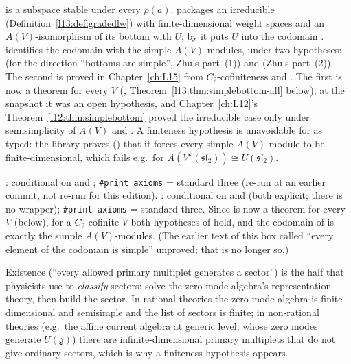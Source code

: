 \begin{dictionary}
 is a subspace stable under every $\rho(a)$.  packages an irreducible
 (Definition~\ref{l13:def:gradedlw}) with finite-dimensional weight spaces and an
$A(V)$-isomorphism of its bottom with $U$; by  it puts $U$ into the codomain
.  identifies the codomain with the simple $A(V)$-modules, under two
hypotheses:  (for the direction ``bottoms are simple'', Zhu's part~(1)) and
 (Zhu's part~(2)). The second is proved in Chapter~\ref{ch:L15} from $C_2$-cofiniteness and
. The first is now a theorem for every $V$ (, Theorem~\ref{l13:thm:simplebottom-all}
below); at the snapshot it was an open hypothesis, and Chapter~\ref{ch:L12}'s Theorem~\ref{l12:thm:simplebottom} proved the
irreducible case only under semisimplicity of $A(V)$ and . A finiteness hypothesis is unavoidable for
 as typed: the library proves () that it forces every
simple $A(V)$-module to be finite-dimensional, which fails e.g.\ for $A(V^k(\mathfrak{sl}_2))\cong U(\mathfrak{sl}_2)$.
\end{dictionary}

\begin{status}
: conditional on  and ;
\texttt{\#print axioms} = standard three (re-run at an earlier commit, not re-run for this edition). : conditional on
 and  (both explicit; there is no  wrapper); \texttt{\#print axioms} = standard three.
Since  is now a theorem for every $V$ (below), for a $C_2$-cofinite $V$ both hypotheses of
 hold, and the codomain of  is exactly the simple $A(V)$-modules.
(The earlier text of this box called ``every element of the codomain is simple'' unproved; that is no longer so.)
\end{status}

\begin{physics}
Existence (``every allowed primary multiplet generates a sector'') is the half that physicists use to \emph{classify}
sectors: solve the zero-mode algebra's representation theory, then build the sector. In rational theories the zero-mode
algebra is finite-dimensional and semisimple and the list of sectors is finite; in non-rational theories (e.g.\ the
affine current algebra at generic level, whose zero modes generate $U(\mathfrak g)$) there are infinite-dimensional
primary multiplets that do not give ordinary sectors, which is why a finiteness hypothesis appears.
\end{physics}

